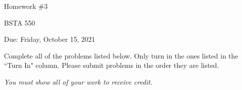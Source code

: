 \documentclass[12pt]{article}
\begin{document}
\begin{center}

Homework \#3

BSTA 550

Due: Friday, October 15, 2021

%
\bigskip



\end{center}


\bigskip

Complete all of the problems listed below. \newline 
Only turn in the ones listed in the ``Turn In" column. \newline
Please submit problems in the order they are listed.

\bigskip

\textit{You must show all of your work to receive credit.}  \newline 



\end{document}

